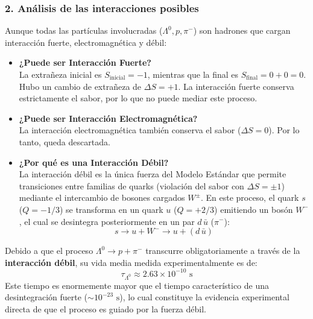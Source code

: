 \subsubsection*{2. Análisis de las interacciones posibles}
Aunque todas las partículas involucradas ($\Lambda^0, p, \pi^-$) son hadrones que cargan interacción fuerte, electromagnética y débil:
\begin{itemize}
    \item \textbf{¿Puede ser Interacción Fuerte?} \\
    La extrañeza inicial es $S_{\text{inicial}} = -1$, mientras que la final es $S_{\text{final}} = 0 + 0 = 0$. Hubo un cambio de extrañeza de $\Delta S = +1$. La interacción fuerte conserva estrictamente el sabor, por lo que no puede mediar este proceso.
    
    \item \textbf{¿Puede ser Interacción Electromagnética?} \\
    La interacción electromagnética también conserva el sabor ($\Delta S = 0$). Por lo tanto, queda descartada.
    
    \item \textbf{¿Por qué es una Interacción Débil?} \\
    La interacción débil es la única fuerza del Modelo Estándar que permite transiciones entre familias de quarks (violación del sabor con $\Delta S = \pm 1$) mediante el intercambio de bosones cargados $W^\pm$. En este proceso, el quark $s$ ($Q=-1/3$) se transforma en un quark $u$ ($Q=+2/3$) emitiendo un bosón $W^-$, el cual se desintegra posteriormente en un par $d\,\bar{u}$ ($\pi^-$):
    $$s \longrightarrow u + W^- \longrightarrow u + (d\,\bar{u})$$
\end{itemize}

\begin{ejemplo}
Debido a que el proceso $\Lambda^0 \to p + \pi^-$ transcurre obligatoriamente a través de la \textbf{interacción débil}, su vida media medida experimentalmente es de:
$$\tau_{\Lambda^0} \approx 2.63 \times 10^{-10} \text{ s}$$
Este tiempo es enormemente mayor que el tiempo característico de una desintegración fuerte ($\sim 10^{-23} \text{ s}$), lo cual constituye la evidencia experimental directa de que el proceso es guiado por la fuerza débil.
\end{ejemplo}

\newpage
